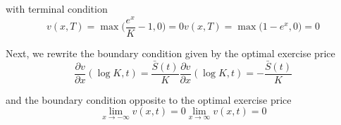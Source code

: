 with terminal condition
\begin{subequations} \label{eq:blackscholes:frontfixingmethod:logtransform:american_options_terminal_condition}
  \begin{equation}
    v(x, T) = \max\bigg(\dfrac{e^x}{K} - 1, 0\bigg) = 0
  \end{equation}
  \begin{equation}
    v(x, T) = \max\bigg(1 - e^x, 0\bigg) = 0
  \end{equation}
\end{subequations}

\newpage

Next, we rewrite the boundary condition given by the optimal exercise price
\begin{subequations}
  \begin{equation}
    \dfrac{\partial v}{\partial x}(\log{K}, t) = \dfrac{\bar{S}(t)}{K} 
  \end{equation}
  \begin{equation}
    \dfrac{\partial v}{\partial x}(\log{K}, t) = -\dfrac{\bar{S}(t)}{K}
  \end{equation}
\end{subequations}

and the boundary condition opposite to the optimal exercise price
\begin{subequations}
  \begin{equation}
    \lim_{x\rightarrow-\infty} v(x, t) = 0
  \end{equation}
  \begin{equation}
    \lim_{x\rightarrow\infty} v(x, t) = 0
  \end{equation}
\end{subequations}

